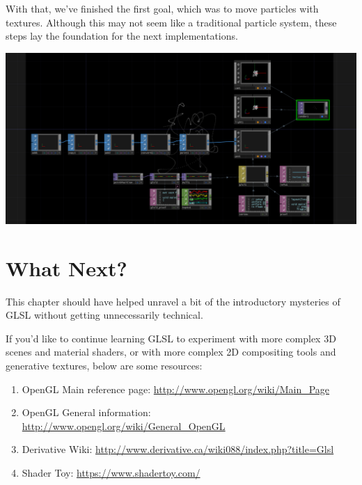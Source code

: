 \begin{fullwidth}
With that, we've finished the first goal, which was to move particles with textures. Although this may not seem like a traditional particle system, these steps lay the foundation for the next implementations.

\begin{center}
\includegraphics{./img/12.6.2/final_step.png}
\end{center}


\end{fullwidth}



\section{What Next?}
\begin{fullwidth}
This chapter should have helped unravel a bit of the introductory mysteries of GLSL without getting unnecessarily technical.

If you'd like to continue learning GLSL to experiment with more complex 3D scenes and material shaders, or with more complex 2D compositing tools and generative textures, below are some resources:

\begin{enumerate}
\item OpenGL Main reference page: \url{http://www.opengl.org/wiki/Main_Page}
\item OpenGL General information: \url{http://www.opengl.org/wiki/General_OpenGL}
\item Derivative Wiki: \url{http://www.derivative.ca/wiki088/index.php?title=Glsl}
\item Shader Toy: \url{https://www.shadertoy.com/}
\end{enumerate}
\end{fullwidth}
